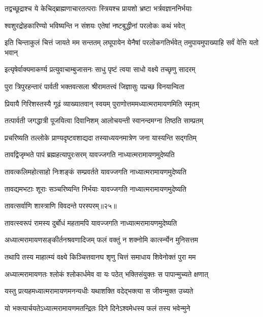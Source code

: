 \twolineshloka
{तद्वच्छूद्राश्च ये केचिद्ब्राह्मणाचारतत्पराः}
{स्त्रियश्च प्रायशो भ्रष्टा भर्त्रवज्ञाननिर्भयाः} %

\twolineshloka
{श्वशुरद्रोहकारिण्यो भविष्यन्ति न संशयः}
{एतेषां नष्टबुद्धीनां परलोकः कथं भवेत्} %

\threelineshloka
{इति चिन्ताकुलं चित्तं जायते मम सन्ततम्}
{लघूपायेन येनैषां परलोकगतिर्भवेत्}
{तमुपायमुपाख्याहि सर्वं वेत्ति यतो भवान्} %

\twolineshloka
{इत्यृषेर्वाक्यमाकर्ण्य प्रत्युवाचाम्बुजासनः}
{साधु पृष्टं त्वया साधो वक्ष्ये तच्छृणु सादरम्} %

\twolineshloka
{पुरा त्रिपुरहन्तारं पार्वती भक्तवत्सला}
{श्रीरामतत्त्वं जिज्ञासुः पप्रच्छ विनयान्विता} %

\twolineshloka
{प्रियायै गिरिशस्तस्यै गूढं व्याख्यातवान् स्वयम्}
{पुराणोत्तममध्यात्मरामायणमिति स्मृतम्} %

\twolineshloka
{तत्पार्वती जगद्धात्री पूजयित्वा दिवानिशम्}
{आलोचयन्ती स्वानन्दमग्ना तिष्ठति साम्प्रतम्} %

\twolineshloka
{प्रचरिष्यति तल्लोके प्राण्यदृष्टवशाद्यदा}
{तस्याध्ययनमात्रेण जना यास्यन्ति सद्गतिम्} %

\twolineshloka
{तावद्विजृम्भते पापं ब्रह्महत्यापुरःसरम्}
{यावज्जगति नाध्यात्मरामायणमुदेष्यति} %

\twolineshloka
{तावत्कलिमहोत्साहो निःशङ्कं सम्प्रवर्तते}
{यावज्जगति नाध्यात्मरामायणमुदेष्यति} %

\twolineshloka
{तावद्यमभटाः शूराः सञ्चरिष्यन्ति निर्भयाः}
{यावज्जगति नाध्यात्मरामायणमुदेष्यति} %

{तावत्सर्वाणि शास्त्राणि विवदन्ते परस्परम्॥२५॥} %


\twolineshloka
{तावत्स्वरूपं रामस्य दुर्बोधं महतामपि}
{यावज्जगति नाध्यात्मरामायणमुदेष्यति} %

\twolineshloka
{अध्यात्मरामायणसङ्कीर्तनश्रवणादिजम्}
{फलं वक्तुं न शक्नोमि कार्त्स्न्येन मुनिसत्तम} %

\twolineshloka
{तथापि तस्य माहात्म्यं वक्ष्ये किञ्चित्तवानघ}
{शृणु चित्तं समाधाय शिवेनोक्तं पुरा मम} %

\twolineshloka
{अध्यात्मरामायणतः श्लोकं श्लोकार्धमेव वा}
{यः पठेत् भक्तिसंयुक्तः स पापान्मुच्यते क्षणात्} %

\twolineshloka
{यस्तु प्रत्यहमध्यात्मरामायणमनन्यधीः}
{यथाशक्ति वदेद्भक्त्या स जीवन्मुक्त उच्यते} %

\twolineshloka
{यो भक्त्यार्चयतेऽध्यात्मरामायणमतन्द्रितः}
{दिने दिनेऽश्वमेधस्य फलं तस्य भवेन्मुने} %


